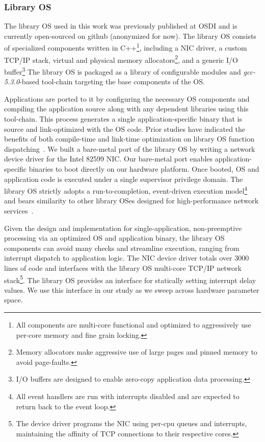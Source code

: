 \subsubsection{Library OS}
\label{sec:OS_libos}
The library OS used in this work was previously published at OSDI and is currently open-sourced on github (anonymized for now). The library OS consists of specialized components written in C++\footnote{ All components are multi-core functional and optimized to aggressively use per-core memory and fine grain locking.}, including a NIC driver, a custom TCP/IP stack, virtual and physical memory allocators\footnote{Memory allocators make aggressive use of large pages and pinned memory to avoid page-faults.}, and a generic I/O buffer\footnote{I/O buffers are designed to enable zero-copy application data processing.} The library OS is packaged as a library of configurable modules and \textit{gcc-5.3.0}-based tool-chain targeting the base components of the OS. 

Applications are ported to it by configuring the necessary OS components and compiling the application source along with any dependent libraries using this tool-chain. This process generates a single application-specific binary that is source and link-optimized with the OS code. Prior studies have indicated the benefits of both compile-time and link-time optimization on library OS function dispatching~\cite{EbbRT}. We built a bare-metal port of the library OS by writing a network device driver for the Intel 82599 NIC. Our bare-metal port enables application-specific binaries to boot directly on our hardware platform. Once booted, OS and application code is executed under a single supervisor privilege domain. The library OS strictly adopts a run-to-completion, event-driven execution model\footnote{All event handlers are run with interrupts disabled and are expected to return back to the event loop.} and bears similarity to other library OSes designed for high-performance network services~\cite{10.1145/2997641, seda, 10.1145/2812806, EbbRT}.


Given the design and implementation for single-application, non-preemptive processing via an optimized OS and application binary, the library OS components can avoid many checks and streamline execution, ranging from interrupt dispatch to application logic. The NIC device driver totals over 3000 lines of code and interfaces with the library OS multi-core TCP/IP network stack\footnote{The device driver programs the NIC using per-cpu queues and interrupts, maintaining the affinity of TCP connections to their respective cores.}. The library OS provides an interface for statically setting interrupt delay values. We use this interface in our study as we sweep across hardware parameter space. 

